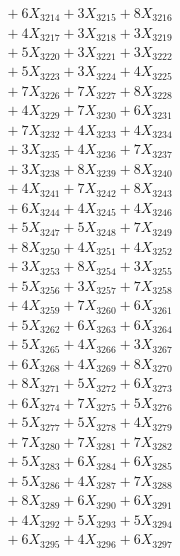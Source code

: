 \documentclass[a4paper,10pt]{article}
\begin{document}
{\begin{align}
&\;  + 6 X_{3214} + 3 X_{3215} + 8 X_{3216} \\[0.3ex]
&\;  + 4 X_{3217} + 3 X_{3218} + 3 X_{3219} \\[0.5ex]\allowbreak
&\;  + 5 X_{3220} + 3 X_{3221} + 3 X_{3222} \\[0.3ex]
&\;  + 5 X_{3223} + 3 X_{3224} + 4 X_{3225} \\[0.3ex]
&\;  + 7 X_{3226} + 7 X_{3227} + 8 X_{3228} \\[0.3ex]
&\;  + 4 X_{3229} + 7 X_{3230} + 6 X_{3231} \\[0.3ex]
&\;  + 7 X_{3232} + 4 X_{3233} + 4 X_{3234} \\[0.3ex]
&\;  + 3 X_{3235} + 4 X_{3236} + 7 X_{3237} \\[0.3ex]
&\;  + 3 X_{3238} + 8 X_{3239} + 8 X_{3240} \\[0.3ex]
&\;  + 4 X_{3241} + 7 X_{3242} + 8 X_{3243} \\[0.3ex]
&\;  + 6 X_{3244} + 4 X_{3245} + 4 X_{3246} \\[0.3ex]
&\;  + 5 X_{3247} + 5 X_{3248} + 7 X_{3249} \\[0.5ex]\allowbreak
&\;  + 8 X_{3250} + 4 X_{3251} + 4 X_{3252} \\[0.3ex]
&\;  + 3 X_{3253} + 8 X_{3254} + 3 X_{3255} \\[0.3ex]
&\;  + 5 X_{3256} + 3 X_{3257} + 7 X_{3258} \\[0.3ex]
&\;  + 4 X_{3259} + 7 X_{3260} + 6 X_{3261} \\[0.3ex]
&\;  + 5 X_{3262} + 6 X_{3263} + 6 X_{3264} \\[0.3ex]
&\;  + 5 X_{3265} + 4 X_{3266} + 3 X_{3267} \\[0.3ex]
&\;  + 6 X_{3268} + 4 X_{3269} + 8 X_{3270} \\[0.3ex]
&\;  + 8 X_{3271} + 5 X_{3272} + 6 X_{3273} \\[0.3ex]
&\;  + 6 X_{3274} + 7 X_{3275} + 5 X_{3276} \\[0.3ex]
&\;  + 5 X_{3277} + 5 X_{3278} + 4 X_{3279} \\[0.5ex]\allowbreak
&\;  + 7 X_{3280} + 7 X_{3281} + 7 X_{3282} \\[0.3ex]
&\;  + 5 X_{3283} + 6 X_{3284} + 6 X_{3285} \\[0.3ex]
&\;  + 5 X_{3286} + 4 X_{3287} + 7 X_{3288} \\[0.3ex]
&\;  + 8 X_{3289} + 6 X_{3290} + 6 X_{3291} \\[0.3ex]
&\;  + 4 X_{3292} + 5 X_{3293} + 5 X_{3294} \\[0.3ex]
&\;  + 6 X_{3295} + 4 X_{3296} + 6 X_{3297} \\[0.3ex]

\end{align}}
\end{document}
